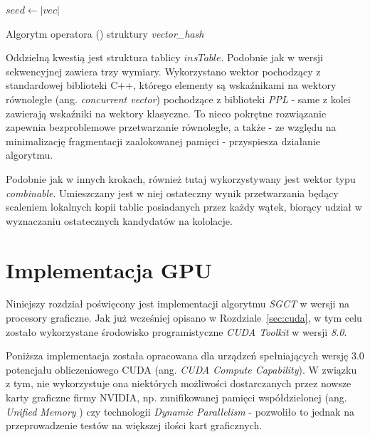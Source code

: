 \documentclass[12pt]{article}
\begin{document}
\begin{algorithm}
$ seed \leftarrow |vec| $\;
\caption{Algorytm operatora () struktury \textit{vector\_hash}}
\label{alg:vector_hash_combine}
\end{algorithm}

Oddzielną kwestią jest struktura tablicy $ insTable $. Podobnie jak w wersji sekwencyjnej zawiera trzy wymiary. Wykorzystano wektor pochodzący z standardowej biblioteki C++, którego elementy są wskaźnikami na wektory równoległe (ang. \textit{concurrent vector}) pochodzące z biblioteki \textit{PPL} - same z kolei zawierają wskaźniki na wektory klasyczne. To nieco pokrętne rozwiązanie zapewnia bezproblemowe przetwarzanie równoległe, a także - ze względu na minimalizację fragmentacji zaalokowanej pamięci - przyspiesza działanie algorytmu.

Podobnie jak w innych krokach, również tutaj wykorzystywany jest wektor typu \textit{combinable}. Umieszczany jest w niej ostateczny wynik przetwarzania będący scaleniem lokalnych kopii tablic posiadanych przez każdy wątek, biorący udział w wyznaczaniu ostatecznych kandydatów na kololacje.

\newpage

\section{Implementacja GPU}
\label{sec:gpu}

Niniejszy rozdział poświęcony jest implementacji algorytmu \textit{SGCT} w wersji na procesory graficzne. Jak już wcześniej opisano w Rozdziale~\ref{sec:cuda}, w tym celu zostało wykorzystane środowisko programistyczne \textit{CUDA Toolkit} w wersji \textit{8.0}.

Poniższa implementacja została opracowana dla urządzeń spełniających wersję 3.0 potencjału obliczeniowego CUDA (ang.\textit{ CUDA Compute Capability}). W związku z tym, nie wykorzystuje ona niektórych możliwości dostarczanych przez nowsze karty graficzne firmy NVIDIA, np. zunifikowanej pamięci współdzielonej (ang. \textit{Unified Memory} \cite{cuda_um}) czy technologii \textit{Dynamic Parallelism} \cite{cuda_dp} - pozwoliło to jednak na przeprowadzenie testów na większej ilości kart graficznych.
\end{document}
